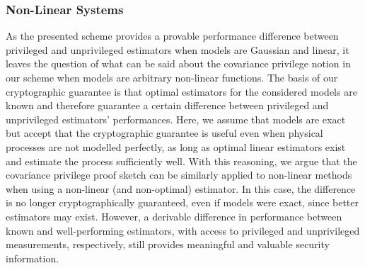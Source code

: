 \subsubsection{Non-Linear Systems}
As the presented scheme provides a provable performance difference between privileged and unprivileged estimators when models are Gaussian and linear, it leaves the question of what can be said about the covariance privilege notion in our scheme when models are arbitrary non-linear functions. The basis of our cryptographic guarantee is that optimal estimators for the considered models are known and therefore guarantee a certain difference between privileged and unprivileged estimators' performances. Here, we assume that models are exact but accept that the cryptographic guarantee is useful even when physical processes are not modelled perfectly, as long as optimal linear estimators exist and estimate the process sufficiently well. With this reasoning, we argue that the covariance privilege proof sketch can be similarly applied to non-linear methods when using a non-linear (and non-optimal) estimator. In this case, the difference is no longer cryptographically guaranteed, even if models were exact, since better estimators may exist. However, a derivable difference in performance between known and well-performing estimators, with access to privileged and unprivileged measurements, respectively, still provides meaningful and valuable security information.

% 
% 

